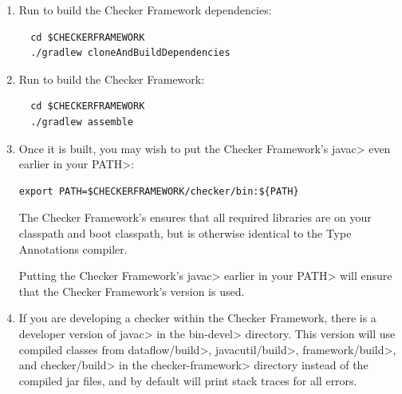 
\begin{enumerate}

\item
Run  to build the Checker Framework dependencies:

\begin{Verbatim}
  cd $CHECKERFRAMEWORK
  ./gradlew cloneAndBuildDependencies
\end{Verbatim}

\item
Run  to build the Checker Framework:

\begin{Verbatim}
  cd $CHECKERFRAMEWORK
  ./gradlew assemble
\end{Verbatim}

\item
Once it is built, you may wish to put the Checker Framework's \<javac>
even earlier in your \<PATH>:

\begin{Verbatim}
export PATH=$CHECKERFRAMEWORK/checker/bin:${PATH}
\end{Verbatim}

The Checker Framework's  ensures that all required
libraries are on your classpath and boot classpath, but is otherwise
identical to the Type Annotations compiler.

Putting the Checker Framework's \<javac> earlier in your \<PATH> will
ensure that the Checker Framework's version is used.

\item
If you are developing a checker within the Checker Framework, there is
a developer version of \<javac> in the \<bin-devel> directory. This
version will use compiled classes from \<dataflow/build>,
\<javacutil/build>, \<framework/build>,
and \<checker/build> in the \<checker-framework> directory instead of
the compiled jar files, and by default will print stack traces for all
errors.


\end{enumerate}
